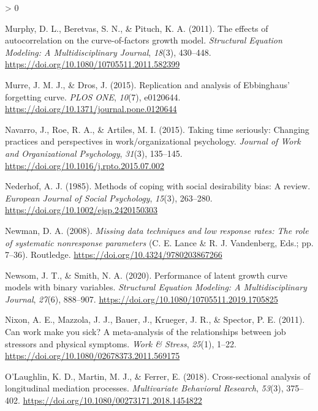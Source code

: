 \documentclass[
12pt, %
twoside,
english]{guelphthesis}
\newlength{\cslhangindent}
\newenvironment{CSLReferences}[2] %
 {%
  \setlength{\parindent}{0pt}
  \ifodd #1 \everypar{\setlength{\hangindent}{\cslhangindent}}\ignorespaces\fi
  \ifnum #2 > 0
  \setlength{\parskip}{\linespacing{2}}
  \fi
 }%
 {}
\begin{document}
\begin{CSLReferences}{1}{0}
\leavevmode{}%
Murphy, D. L., Beretvas, S. N., \& Pituch, K. A. (2011). The effects of autocorrelation on the curve-of-factors growth model. \emph{Structural Equation Modeling: A Multidisciplinary Journal}, \emph{18}(3), 430--448. \url{https://doi.org/10.1080/10705511.2011.582399}

\leavevmode{}%
Murre, J. M. J., \& Dros, J. (2015). Replication and analysis of Ebbinghaus{'} forgetting curve. \emph{PLOS ONE}, \emph{10}(7), e0120644. \url{https://doi.org/10.1371/journal.pone.0120644}

\leavevmode{}%
Navarro, J., Roe, R. A., \& Artiles, M. I. (2015). Taking time seriously: Changing practices and perspectives in work/organizational psychology. \emph{Journal of Work and Organizational Psychology}, \emph{31}(3), 135--145. \url{https://doi.org/10.1016/j.rpto.2015.07.002}

\leavevmode{}%
Nederhof, A. J. (1985). Methods of coping with social desirability bias: A review. \emph{European Journal of Social Psychology}, \emph{15}(3), 263--280. \url{https://doi.org/10.1002/ejsp.2420150303}

\leavevmode{}%
Newman, D. A. (2008). \emph{Missing data techniques and low response rates: The role of systematic nonresponse parameters} (C. E. Lance \& R. J. Vandenberg, Eds.; pp. 7--36). Routledge. \url{https://doi.org/10.4324/9780203867266}

\leavevmode{}%
Newsom, J. T., \& Smith, N. A. (2020). Performance of latent growth curve models with binary variables. \emph{Structural Equation Modeling: A Multidisciplinary Journal}, \emph{27}(6), 888--907. \url{https://doi.org/10.1080/10705511.2019.1705825}

\leavevmode{}%
Nixon, A. E., Mazzola, J. J., Bauer, J., Krueger, J. R., \& Spector, P. E. (2011). Can work make you sick? A meta-analysis of the relationships between job stressors and physical symptoms. \emph{Work \& Stress}, \emph{25}(1), 1--22. \url{https://doi.org/10.1080/02678373.2011.569175}

\leavevmode{}%
O'Laughlin, K. D., Martin, M. J., \& Ferrer, E. (2018). Cross-sectional analysis of longitudinal mediation processes. \emph{Multivariate Behavioral Research}, \emph{53}(3), 375--402. \url{https://doi.org/10.1080/00273171.2018.1454822}


\end{CSLReferences}
\end{document}

